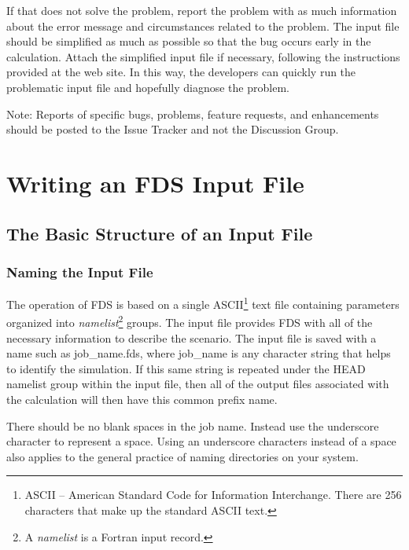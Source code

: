 \documentclass[11pt]{book}
\begin{document}
If that does not solve the problem, report the problem with as much information about the error message and
circumstances related to the problem. The input file should be simplified
as much as possible so that the bug occurs early in the calculation.
Attach the simplified input file if necessary, following the instructions provided at the web site.
In this way, the developers can quickly run the problematic input file and hopefully diagnose the problem.

Note: Reports of specific bugs, problems, feature requests, and enhancements
should be posted to the Issue Tracker and not the Discussion Group.









\part{Writing an FDS Input File}
\label{info:inputfilecreation}



\chapter{The Basic Structure of an Input File}
\label{info:fdsBasic}


\section{Naming the Input File}

The operation of FDS is based on a single ASCII\footnote{ASCII -- American Standard Code
for Information Interchange. There are 256 characters that make up the standard ASCII text.} text file containing parameters organized into
{\em namelist}\footnote{A {\em namelist} is a Fortran input record.} groups.
The input file provides FDS  with all of the necessary information to
describe the scenario.
The input file is saved with a name such as {\ct job\_name.fds},
where {\ct job\_name} is any character string that helps to identify
the simulation. If this same string is repeated under the {\ct HEAD} namelist group within the
input file, then all of the output files associated with the calculation will then have this common prefix name.

There should be no blank spaces in the job name. Instead use the underscore
character to represent a space.  Using an underscore characters instead of a space also applies
to the general practice of naming directories on your system.
\end{document}
